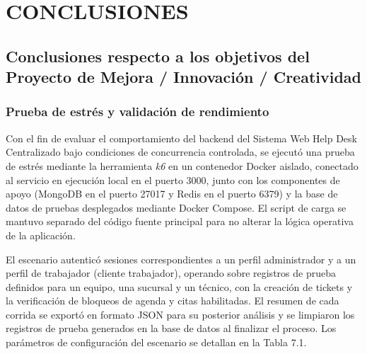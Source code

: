 \chapter[CAPÍTULO VII]{CONCLUSIONES}

\section{Conclusiones respecto a los objetivos del Proyecto de Mejora / Innovación / Creatividad}

\subsection{Prueba de estrés y validación de rendimiento}

Con el fin de evaluar el comportamiento del backend del Sistema Web Help Desk Centralizado bajo condiciones de concurrencia controlada, se ejecutó una prueba de estrés mediante la herramienta \textit{k6} en un contenedor Docker aislado, conectado al servicio en ejecución local en el puerto 3000, junto con los componentes de apoyo (MongoDB en el puerto 27017 y Redis en el puerto 6379) y la base de datos de pruebas desplegados mediante Docker Compose. El script de carga se mantuvo separado del código fuente principal para no alterar la lógica operativa de la aplicación.

El escenario autenticó sesiones correspondientes a un perfil administrador y a un perfil de trabajador (cliente trabajador), operando sobre registros de prueba definidos para un equipo, una sucursal y un técnico, con la creación de tickets y la verificación de bloqueos de agenda y citas habilitadas. El resumen de cada corrida se exportó en formato JSON para su posterior análisis y se limpiaron los registros de prueba generados en la base de datos al finalizar el proceso. Los parámetros de configuración del escenario se detallan en la Tabla 7.1.

